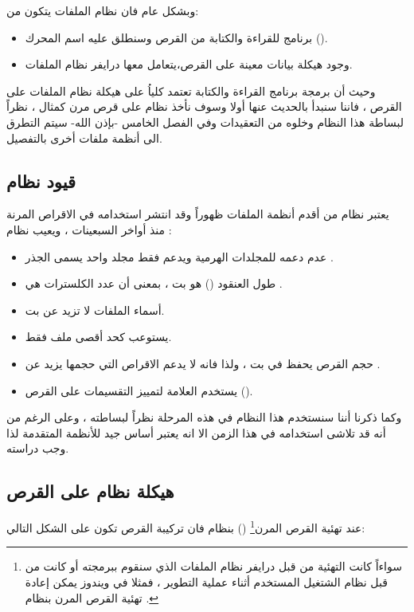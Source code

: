 \documentclass[document.tex]{subfiles}
\begin{document}
وبشكل عام فان نظام الملفات يتكون من:
\begin{itemize}
\item برنامج للقراءة والكتابة من القرص وسنطلق عليه اسم المحرك ().
\item وجود هيكلة بيانات  معينة على القرص،يتعامل معها درايفر نظام الملفات.

\end{itemize}  

وحيث أن برمجة برنامج القراءة والكتابة تعتمد كلياُ على هيكلة نظام الملفات على القرص ، فاننا سنبدأ بالحديث عنها أولا وسوف نأخذ نظام  على قرص مرن كمثال ، نظراً لبساطة هذا النظام وخلوه من التعقيدات وفي الفصل الخامس -بإذن الله- سيتم التطرق الى أنظمة ملفات أخرى بالتفصيل.

\subsection{قيود نظام }
يعتبر نظام  من أقدم أنظمة الملفات ظهوراً وقد انتشر استخدامه في الاقراص المرنة منذ أواخر السبعينات ، ويعيب نظام  :
\begin{itemize}
\item عدم دعمه للمجلدات الهرمية ويدعم فقط مجلد واحد يسمى الجذر .
\item طول العنقود () هو  بت ، بمعنى أن عدد الكلسترات هي .
\item أسماء الملفات لا تزيد عن  بت.
\item يستوعب كحد أقصى  ملف فقط.
\item حجم القرص يحفظ في  بت ، ولذا فانه لا يدعم الاقراص التي حجمها يزيد عن .
\item يستخدم العلامة  لتمييز التقسيمات على القرص ().


\end{itemize}

وكما ذكرنا أننا سنستخدم هذا النظام في هذه المرحلة نظراً لبساطته ، وعلى الرغم من أنه قد تلاشى استخدامه في هذا الزمن الا انه يعتبر أساس جيد للأنظمة المتقدمة لذا وجب دراسته.


\subsection{هيكلة نظام  على القرص}
عند تهئية القرص المرن\footnote{سواءاً كانت التهئية من قبل درايفر نظام الملفات الذي سنقوم ببرمجته أو كانت من قبل نظام الشتغيل المستخدم أثناء عملية التطوير ، فمثلا في ويندوز يمكن إعادة تهئية القرص المرن بنظام  .} () بنظام  فان تركيبة القرص تكون على الشكل التالي:\\
\end{document}
